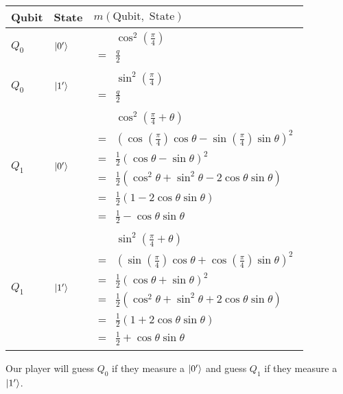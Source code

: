 \begin{tabular}{lll}
    \toprule
Qubit& State&$m(\text{Qubit}, \text{ State})$\\
\midrule
$Q_0$&$\lvert0'\rangle$&$\begin{aligned}\phantom{ }&\cos^2(\frac{\pi}{4})\\=&\frac{q}{2}\end{aligned}$\\
\hline
$Q_0$&$\lvert1'\rangle$&$\begin{aligned}\phantom{ }&\sin^2(\frac{\pi}{4})\\=&\frac{q}{2}\end{aligned}$\\
\hline
$Q_1$&$\lvert0'\rangle$&$
    \begin{aligned}
        \phantom{ }&\cos^2(\frac{\pi}{4}+\theta)\\
        =&(\cos(\frac{\pi}{4})\cos\theta-\sin(\frac{\pi}{4})\sin\theta)^2\\
        =&\frac{1}{2}(\cos\theta -\sin\theta)^2\\
        =&\frac{1}{2}(\cos^2\theta + \sin^2\theta - 2\cos\theta \sin\theta)\\
        =&\frac{1}{2}(1 - 2\cos\theta \sin\theta)\\
        =&\frac{1}{2} - \cos\theta \sin\theta
    \end{aligned}$\\
\hline
    $Q_1$&$\lvert1'\rangle$&$
    \begin{aligned}
        \phantom{ }&\sin^2(\frac{\pi}{4}+\theta)\\
        =&(\sin(\frac{\pi}{4})\cos\theta+\cos(\frac{\pi}{4})\sin\theta)^2\\
        =&\frac{1}{2}(\cos\theta +\sin\theta)^2\\
        =&\frac{1}{2}(\cos^2\theta + \sin^2\theta + 2\cos\theta \sin\theta)\\
        =&\frac{1}{2}(1 + 2\cos\theta \sin\theta)\\
        =&\frac{1}{2} + \cos\theta \sin\theta
    \end{aligned}$\\
    \bottomrule
\end{tabular}


Our player will guess $Q_0$ if they measure a $\lvert0'\rangle$ and guess $Q_1$ if they measure a $\lvert1'\rangle$.

